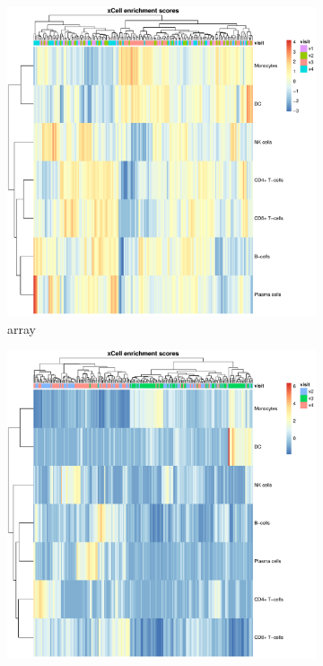\begin{figure}
    \centering
    \begin{subfigure}[b]{0.49\textwidth}
        \centering
        \includegraphics[width=1.0\textwidth,page=8]{mainmatter/figures/chapter_03/get_xCell_estimates.dataset_array.plots.pdf}
        \caption{array}
    \end{subfigure}%
    \hfill%
    \begin{subfigure}[b]{0.49\textwidth}
        \centering
        \includegraphics[width=1.0\textwidth,page=8]{mainmatter/figures/chapter_03/get_xCell_estimates.dataset_rnaseq.plots.pdf}

\end{subfigure}
\end{figure}
